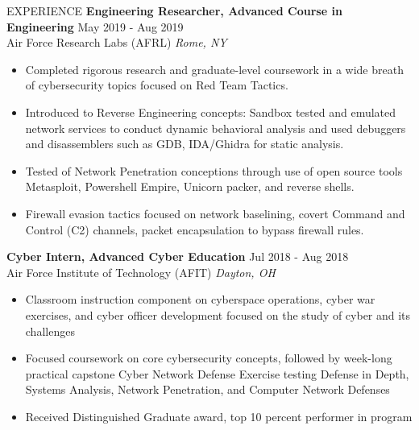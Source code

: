 \documentclass{resume} %
\begin{document}
\begin{rSection}{EXPERIENCE}
\textbf{Engineering Researcher, Advanced Course in Engineering} \hfill May 2019 - Aug 2019\\
Air Force Research Labs (AFRL) \hfill \textit{Rome, NY}
 \begin{itemize}
    \itemsep -3pt {} 
     \item Completed rigorous research and graduate-level coursework in a wide breath of cybersecurity topics focused on Red Team Tactics.
     \item Introduced to Reverse Engineering concepts: Sandbox tested and emulated network services to conduct dynamic behavioral analysis and used debuggers and disassemblers such as GDB, IDA/Ghidra for static analysis.
     \item Tested of Network Penetration conceptions through use of open source tools Metasploit, Powershell Empire, Unicorn packer, and reverse shells.
     \item Firewall evasion tactics focused on network baselining, covert Command and Control (C2) channels, packet encapsulation to bypass firewall rules.

 \end{itemize}

\textbf{Cyber Intern, Advanced Cyber Education} \hfill Jul 2018 - Aug 2018\\
Air Force Institute of Technology (AFIT) \hfill \textit{Dayton, OH}
 \begin{itemize}
    \itemsep -3pt {} 
     \item Classroom instruction component on cyberspace operations, cyber war exercises, and cyber officer development focused on the study of cyber and its challenges
     \item Focused coursework on core cybersecurity concepts, followed by week-long practical capstone Cyber Network Defense Exercise testing Defense in Depth, Systems Analysis, Network Penetration, and Computer Network Defenses
     \item Received Distinguished Graduate award, top 10 percent performer in program
 \end{itemize}
\end{rSection} 

\end{document}
